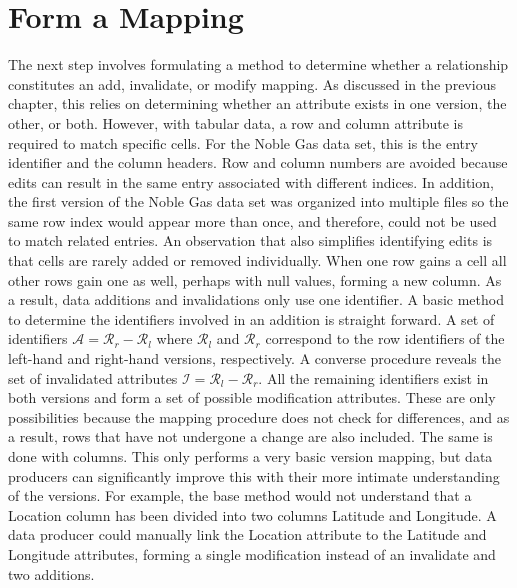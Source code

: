 \section{Form a Mapping} \label{mapping}

The next step involves formulating a method to determine whether a relationship constitutes an add, invalidate, or modify mapping.
As discussed in the previous chapter, this relies on determining whether an attribute exists in one version, the other, or both.
However, with tabular data, a row and column attribute is required to match specific cells.
For the Noble Gas data set, this is the entry identifier and the column headers.
Row and column numbers are avoided because edits can result in the same entry associated with different indices.
In addition, the first version of the Noble Gas data set was organized into multiple files so the same row index would appear more than once, and therefore, could not be used to match related entries.
An observation that also simplifies identifying edits is that cells are rarely added or removed individually.
When one row gains a cell all other rows gain one as well, perhaps with null values, forming a new column.
As a result, data additions and invalidations only use one identifier.
A basic method to determine the identifiers involved in an addition is straight forward.
A set of identifiers \(\mathcal{A} = \mathcal{R}_{r} - \mathcal{R}_{l}\) where \(\mathcal{R}_{l}\) and \(\mathcal{R}_{r}\) correspond to the row identifiers of the left-hand and right-hand versions, respectively.
A converse procedure reveals the set of invalidated attributes \(\mathcal{I} = \mathcal{R}_{l} - \mathcal{R}_{r}\).
All the remaining identifiers exist in both versions and form a set of possible modification attributes.
These are only possibilities because the mapping procedure does not check for differences, and as a result, rows that have not undergone a change are also included.
The same is done with columns.
This only performs a very basic version mapping, but data producers can significantly improve this with their more intimate understanding of the versions.
For example, the base method would not understand that a Location column has been divided into two columns Latitude and Longitude.
A data producer could manually link the Location attribute to the Latitude and Longitude attributes, forming a single modification instead of an invalidate and two additions.

